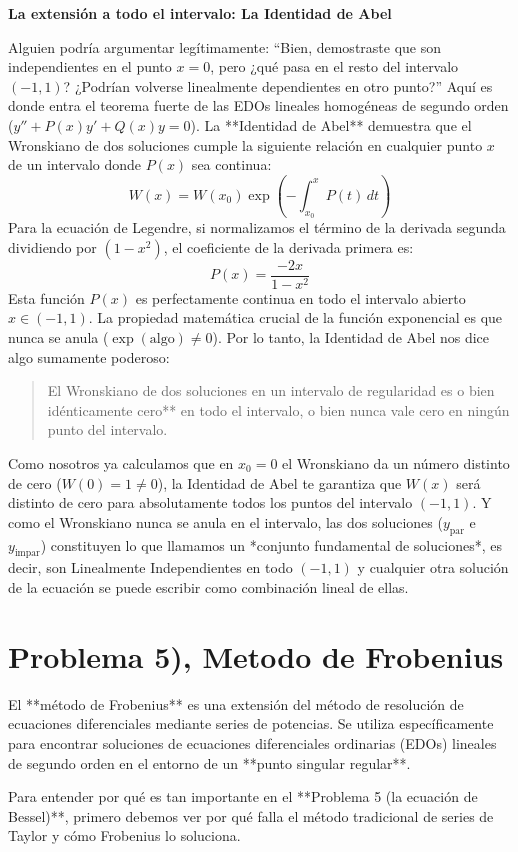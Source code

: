 \documentclass[11pt,spanish]{article}
\begin{document}
{\bf La extensión a todo el intervalo: La Identidad de Abel}

Alguien podría argumentar legítimamente: ``Bien, demostraste que son independientes en el punto $x=0$, pero ¿qué pasa en el resto del intervalo $(-1,1)$? ¿Podrían volverse linealmente dependientes en otro punto?''
Aquí es donde entra el teorema fuerte de las EDOs lineales homogéneas de segundo orden ($y'' + P(x)y' + Q(x)y = 0$). La **Identidad de Abel** demuestra que el Wronskiano de dos soluciones cumple la siguiente relación en cualquier punto $x$ de un intervalo donde $P(x)$ sea continua:
$$W(x) = W(x_0) \exp\left( -\int_{x_0}^x P(t) \, dt \right)$$
Para la ecuación de Legendre, si normalizamos el término de la derivada segunda dividiendo por $(1-x^2)$, el coeficiente de la derivada primera es:
$$P(x) = \frac{-2x}{1-x^2}$$
Esta función $P(x)$ es perfectamente continua en todo el intervalo abierto $x \in (-1, 1)$.
La propiedad matemática crucial de la función exponencial es que nunca se anula ($\exp(\text{algo}) \neq 0$). Por lo tanto, la Identidad de Abel nos dice algo sumamente poderoso:
\begin{quotation}
El Wronskiano de dos soluciones en un intervalo de regularidad es o bien idénticamente cero** en todo el intervalo, o bien nunca vale cero en ningún punto del intervalo.
\end{quotation}
Como nosotros ya calculamos que en $x_0=0$ el Wronskiano da un número distinto de cero ($W(0) = 1 \neq 0$), la Identidad de Abel te garantiza que $W(x)$ será distinto de cero para absolutamente todos los puntos del intervalo $(-1,1)$.
Y como el Wronskiano nunca se anula en el intervalo, las dos soluciones ($y_{\text{par}}$ e $y_{\text{impar}}$) constituyen lo que llamamos un *conjunto fundamental de soluciones*, es decir, son Linealmente Independientes en todo $(-1,1)$ y cualquier otra solución de la ecuación se puede escribir como combinación lineal de ellas.

\section{Problema 5), Metodo de Frobenius}

El **método de Frobenius** es una extensión del método de resolución de ecuaciones diferenciales mediante series de potencias. Se utiliza específicamente para encontrar soluciones de ecuaciones diferenciales ordinarias (EDOs) lineales de segundo orden en el entorno de un **punto singular regular**.

Para entender por qué es tan importante en el **Problema 5 (la ecuación de Bessel)**, primero debemos ver por qué falla el método tradicional de series de Taylor y cómo Frobenius lo soluciona.
\end{document}
